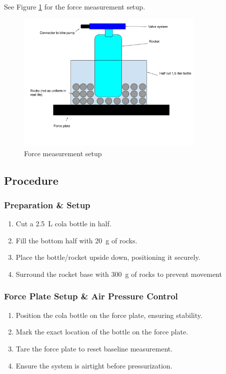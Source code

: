 \documentclass[12pt,a4paper]{article}
\begin{document}
See Figure \ref{fig:measuring_force} for the force measurement setup.

\begin{figure}[H]
\centering
\includegraphics[width=0.8\textwidth]{measuring force.pdf}
\caption{Force measurement setup}
\label{fig:measuring_force}
\end{figure}

\subsection{Procedure}

\subsubsection{Preparation \& Setup}
\begin{enumerate}
\item Cut a \SI{2.5}{\liter} cola bottle in half.
\item Fill the bottom half with \SI{20}{\gram} of rocks.
\item Place the bottle/rocket upside down, positioning it securely.
\item Surround the rocket base with \SI{300}{\gram} of rocks to prevent movement
\end{enumerate}

\subsubsection{Force Plate Setup \& Air Pressure Control}
\begin{enumerate}
\item Position the cola bottle on the force plate, ensuring stability.
\item Mark the exact location of the bottle on the force plate.
\item Tare the force plate to reset baseline measurement.
\item Ensure the system is airtight before pressurization.
\end{enumerate}
\end{document}
